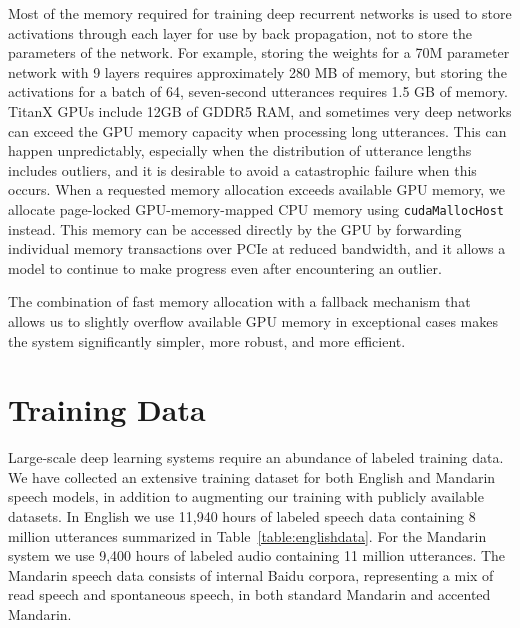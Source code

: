 \documentclass{article}
\begin{document}
Most of the memory required for training deep recurrent networks is used to store activations through each layer for use by back propagation, not to store the parameters of the network. For example, storing the weights for a 70M parameter network with 9 layers requires approximately 280 MB of memory, but storing the activations for a batch of 64, seven-second utterances requires 1.5 GB of memory. TitanX GPUs include 12GB of GDDR5 RAM, and sometimes very deep networks can exceed the GPU memory capacity when processing long utterances. This can happen unpredictably, especially when the distribution of utterance lengths includes outliers, and it is desirable to avoid a catastrophic failure when this occurs. When a requested memory allocation exceeds available GPU memory, we allocate page-locked GPU-memory-mapped CPU memory using \texttt{cudaMallocHost} instead. This memory can be accessed directly by the GPU by forwarding individual memory transactions over PCIe at reduced bandwidth, and it allows a model to continue to make progress even after encountering an outlier.

The combination of fast memory allocation with a fallback mechanism that allows us to slightly overflow available GPU memory in exceptional cases makes the system significantly simpler, more robust, and more efficient.


\section{Training Data}
\label{section:data}

Large-scale deep learning systems require an abundance of labeled training data. We have collected an extensive training dataset for both English and Mandarin speech models, in addition to augmenting our training with publicly available datasets. In English we use 11,940 hours of labeled speech data containing 8 million utterances summarized in Table~\ref{table:englishdata}. For the Mandarin system we use 9,400 hours of labeled audio containing 11 million utterances. The Mandarin speech data consists of internal Baidu corpora, representing a mix of read speech and spontaneous speech, in both standard Mandarin and accented Mandarin.
\end{document}
